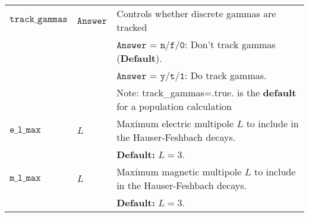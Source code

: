 \documentclass[
10pt,
showpacs,preprintnumbers,footinbib,
amsfonts,amsmath,amssymb,
aps,
prc,twocolumn,groupedaddress,superscriptaddress,
showkeys,
nofootinbib
]{revtex4-1}
\begin{document}
\begin{center}
\begin{tabular}{| p{4cm} | p{4 cm} | p{9 cm} |}
\hline
${\texttt{track\_gammas}}$  & ${\texttt{Answer}}$  &    Controls whether discrete gammas are tracked \\
 & &   ${\texttt{Answer}}$ = ${\texttt{n/f/0}}$:  Don't track gammas  ({\bf Default}).\\
  & &  ${\texttt{Answer}}$ = ${\texttt{y/t/1}}$:  Do track gammas.\\
 &  &  Note: track\_gammas=.true. is the {\bf default} for a population calculation\\
\hline
${\texttt{e\_l\_max}}$ & $L$ & Maximum electric multipole $L$ to include in the Hauser-Feshbach decays.\\
& & {\bf Default:} $L=3$.\\
\hline
${\texttt{m\_l\_max}}$ & $L$ & Maximum magnetic multipole $L$ to include in the Hauser-Feshbach decays.\\
& & {\bf Default:} $L=3$.\\
\hline
\end{tabular}
\end{center}
\end{document}
